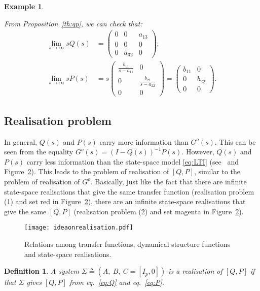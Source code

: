 \documentclass[twocolumn,12pt]{autart}
\theoremstyle{plain}
\newtheorem{definition}{Definition}
\newtheorem{example}{Example}
\begin{document}
\begin{example}
\begin{figure}[!]
\label{fig:ex1}
\end{figure}
From Proposition~\ref{th:qp}, we can check that:
\begin{align*}
  \lim_{s\rightarrow \infty} s {Q}(s)&=\begin{pmatrix} 0 & 0 & a_{13}  \\
	0 & 0 & 0  \\
	0 & a_{32} & 0 \end{pmatrix} ;\\
\lim_{s\rightarrow \infty} s {P}(s)&=s\begin{pmatrix} \frac{b_{11}}{s-a_{11}} & 0 \\ 0 & \frac{b_{22}}{s-a_{22}} \\ 0 & 0 \end{pmatrix}=\begin{pmatrix}b_{11} & 0 \\ 0 & b_{22} \\ 0 & 0  \end{pmatrix}.
\end{align*}
\end{example}




\subsection{Realisation problem}

In general, ${Q(s)}$ and ${P(s)}$ carry more information than ${G^o(s)}$. This can be seen from the equality ${G^o}(s) = ({I}-{Q}(s))^{-1}{P}(s)$.  However, ${Q(s)}$ and ${P(s)}$ carry less information than the state-space model \eqref{eq:LTI} (see~\cite{08net_rec,robust} and Figure~\ref{fig:problems}). This leads to the problem of realisation of $[{Q},{P}]$, similar to the problem of realisation of $G^o$. Basically, just like the fact that there are infinite state-space realisations that give the same transfer function (realisation problem (1) and set red in Figure~\ref{fig:problems}), there are an infinite state-space realisations that give the same $[{Q},{P}]$ (realisation problem (2) and set magenta in Figure~\ref{fig:problems}).

\begin{figure}[h]
\centering
  \texttt{[image: ideaonrealisation.pdf]}
\caption{Relations among transfer functions, dynamical structure functions and state-space realisations.} \label{fig:problems}     
\end{figure}


\begin{definition}A system $\Sigma\triangleq(A,~B,~C=[I_p,0])$ is a realisation of $[{Q},{P}]$ if that $\Sigma$ gives $[{Q},{P}]$ from eq.~\eqref{eq:Q} and eq.~\eqref{eq:P}.
\end{definition}
\end{document}
